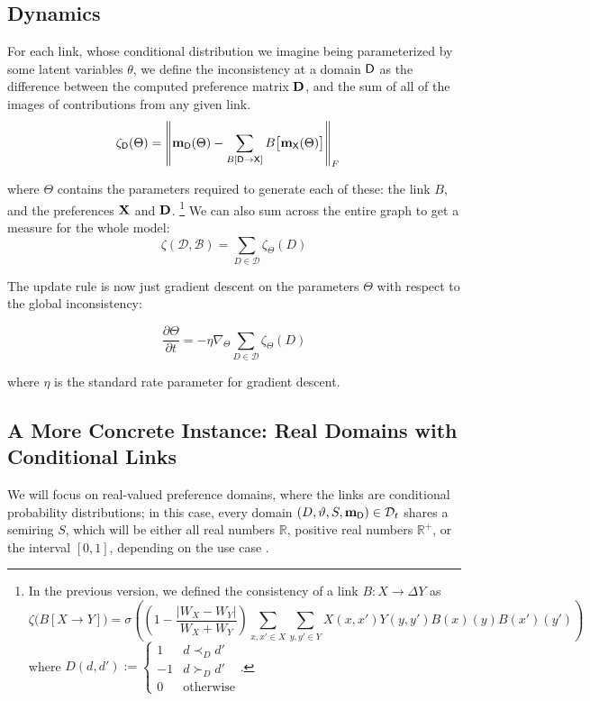 \documentclass{article}
\begin{document}
 	
 	
 	\subsection{Dynamics} \label{sec:formal-dynamics}
	
	
	
	For each link, whose conditional distribution we imagine being parameterized by some latent variables $\theta$, we define the inconsistency at a domain $\sf D$ as the difference between the computed preference matrix $\mathbf D$, and the sum of all of the images of contributions from any given link.
	\begin{align*}
		\zeta_{\mathsf D}(\Theta) &= \left\lVert \mathbf m_{\mathsf D}(\Theta)  - \sum_{B[\sf D \to X]} B\big[\mathbf m_{\mathsf X}(\Theta) \big] \right\rVert_F
	\end{align*}

	where $\Theta$ contains the parameters required to generate each of these: the link $B$, and the preferences $\mathbf X$ and $\mathbf D$.
 	\footnote{In the previous version, we defined the consistency of a link $B : X \to \Delta Y$ as 
 	 	\[ \zeta\big(B[X \to Y]\big) =  \sigma \left( \left(1- \frac{|W_X - W_Y|}{W_X + W_Y}\right) \sum_{x,x' \in X}\sum_{y,y' \in Y} X(x,x') Y(y,y') B(x)(y) B(x')(y') \right) \]
 		where 
 	 	$ D(d, d') := \begin{cases}
 	 		1 & d \prec_D d' \\
 	 		-1 & d \succ_D d' \\
 	 		0 & \text{otherwise}
 	 	\end{cases} $.  }	
 	We can also sum across the entire graph to get a measure for the whole model:
 	\[ \zeta(\mathcal D, \mathcal B) = \sum_{D \in \mathcal D} \zeta_\Theta(D) \]
 	
 	The update rule is now just gradient descent on the parameters $\Theta$ with respect to the global inconsistency:
 	
 	\[ \frac{\partial \Theta}{\partial t} = - \eta \nabla_\Theta \sum_{D \in \mathcal D} \zeta_\Theta(D) \]
 	
 	where $\eta$ is the standard rate parameter for gradient descent.
 	
 	

 	
 	\subsection{A More Concrete Instance: Real Domains with Conditional Links}
 	We will focus on real-valued preference domains, where the links are conditional probability distributions; in this case, every domain $(D, \vartheta, S, \mathbf m_{\mathsf D}) \in \mathcal D_t$ shares a semiring $S$, which will be either all real numbers $\mathbb R$, positive real numbers $\mathbb R^+$, or the interval $[0,1]$, depending on the use case .
 	
\end{document}
